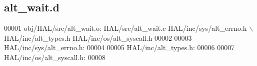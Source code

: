 \subsection{alt\+\_\+wait.\+d}
\label{alt__wait_8d_source}

\begin{DoxyCode}
00001 obj/HAL/src/alt\_wait.o: HAL/src/alt\_wait.c HAL/inc/sys/alt_errno.h \(\backslash\)
 HAL/inc/alt\_types.h HAL/inc/os/alt\_syscall.h
00002 
00003 HAL/inc/sys/alt_errno.h:
00004 
00005 HAL/inc/alt\_types.h:
00006 
00007 HAL/inc/os/alt\_syscall.h:
00008 \end{DoxyCode}
